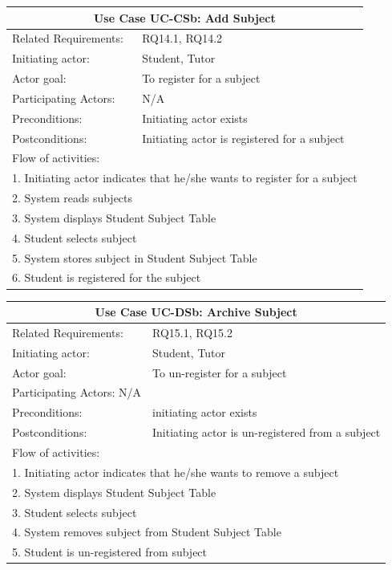 \documentclass[12pt]{article}
\begin{document}
{		\begin{tabular}{| l | p{10cm}| }
			\hline\multicolumn{2}{|c|}{ \textbf{Use Case UC-CSb: Add Subject}} \\ \hline
			Related Requirements: & RQ14.1, RQ14.2  \\ \hline
			Initiating actor: & Student, Tutor \\ \hline
			Actor goal: & To register for a subject\\ \hline
			Participating Actors: &N/A\\ \hline
			Preconditions: &Initiating actor exists\\ \hline
			Postconditions: & Initiating actor is registered for a subject\\ \hline
			\multicolumn{2}{|l|}{Flow of activities:}\\ \hline
			\multicolumn{2}{|p{15cm}|}{1. Initiating actor indicates that he/she wants to register for a subject}\\
			\multicolumn{2}{|p{15cm}|}{2. System reads subjects}\\ 
			\multicolumn{2}{|p{15cm}|}{3. System displays Student Subject Table}\\
			\multicolumn{2}{|l|}{4. Student selects subject}\\
			\multicolumn{2}{|l|}{5. System stores subject in Student Subject Table}\\
			\multicolumn{2}{|l|}{6. Student is registered for the subject}\\
			 \hline		
		\end{tabular}
		
		\begin{tabular}{| l | p{10cm}| }
			\hline\multicolumn{2}{|c|}{ \textbf{Use Case UC-DSb: Archive Subject} }\\ \hline
			Related Requirements: & RQ15.1, RQ15.2  \\ \hline
			Initiating actor: & Student, Tutor \\ \hline
			Actor goal: & To un-register for a subject\\ \hline
			Participating Actors: N/A\\ \hline
			Preconditions: &initiating actor exists\\ \hline
			Postconditions: & Initiating actor is un-registered from a subject\\ \hline
			\multicolumn{2}{|l|}{Flow of activities:}\\ \hline
			\multicolumn{2}{|p{15cm}|}{1. Initiating actor indicates that he/she wants to remove a subject}\\ 
			\multicolumn{2}{|p{15cm}|}{2. System displays Student Subject Table}\\
			\multicolumn{2}{|l|}{3. Student selects subject}\\
			\multicolumn{2}{|l|}{4. System removes subject from Student Subject Table}\\
			\multicolumn{2}{|l|}{5. Student is un-registered from subject}\\
			 \hline		
		\end{tabular}
		
}
\end{document}
